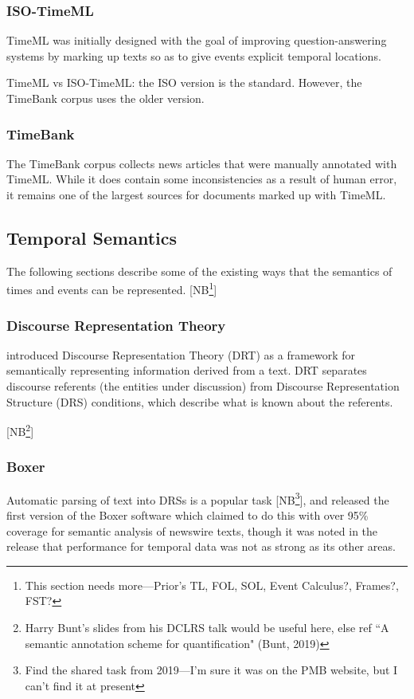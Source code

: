 \documentclass[a4paper,12pt,leqno]{article}
\newcommand{\selfnote}[1]{{\color{red}[NB\footnote{{\color{red}#1}}]}}
\begin{document}
\subsubsection{ISO-TimeML}\label{ssub:timeml}
TimeML \citep{Pustejovsky2005} was initially designed with the goal of improving question-answering systems by marking up texts so as to give events explicit temporal locations.

TimeML vs ISO-TimeML: the ISO version is the standard. However, the TimeBank corpus uses the older version.

\subsubsection{TimeBank}\label{ssub:timebank}
The TimeBank corpus \citep{pustejovsky2006timebank} collects news articles that were manually annotated with TimeML. While it does contain some inconsistencies as a result of human error, it remains one of the largest sources for documents marked up with TimeML.
\subsection{Temporal Semantics}\label{sub:semantics}
The following sections describe some of the existing ways that the semantics of times and events can be represented. \selfnote{This section needs more---Prior's TL, FOL, SOL, Event Calculus?, Frames?, FST?}
\subsubsection{Discourse Representation Theory}\label{ssub:drt}
\citet{Kamp1993} introduced Discourse Representation Theory (DRT) as a framework for semantically representing information derived from a text. DRT separates discourse referents (the entities under discussion) from Discourse Representation Structure (DRS) conditions, which describe what is known about the referents.

\selfnote{Harry Bunt's slides from his DCLRS talk would be useful here, else ref ``A semantic annotation scheme for quantiﬁcation" (Bunt, 2019)}
\subsubsection{Boxer}\label{ssub:boxer}
Automatic parsing of text into DRSs is a popular task \selfnote{Find the shared task from 2019---I'm sure it was on the PMB website, but I can't find it at present}, and \citet{Bos2008} released the first version of the Boxer software which claimed to do this with over 95\% coverage for semantic analysis of newswire texts, though it was noted in the release that performance for temporal data was not as strong as its other areas.
\end{document}
